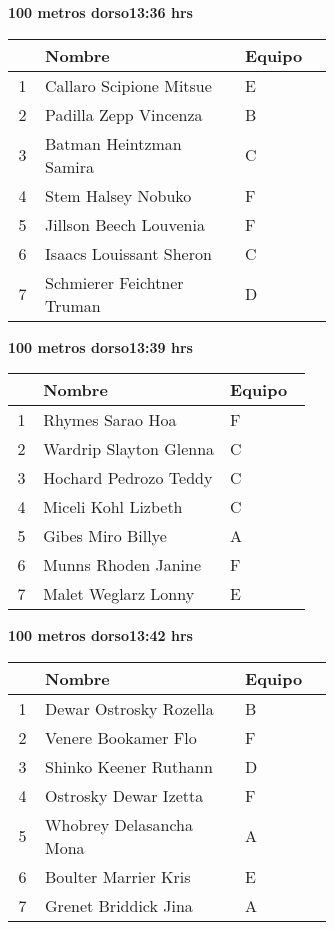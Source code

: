 \begin{minipage}{0.95\linewidth}
\begin{center}
\textbf{
100 metros dorso\hspace{1cm}13:36 hrs}
\end{center}
\begin{tabular}{cp{0.63\linewidth}l}
\hline
& \textbf{Nombre} & \textbf{Equipo} \\ \hline
1 & Callaro Scipione Mitsue & E \\ 
2 & Padilla Zepp Vincenza & B \\ 
3 & Batman Heintzman Samira & C \\ 
4 & Stem Halsey Nobuko & F \\ 
5 & Jillson Beech Louvenia & F \\ 
6 & Isaacs Louissant Sheron & C \\ 
7 & Schmierer Feichtner Truman & D \\ 
\end{tabular}
\end{minipage}
\begin{minipage}{0.95\linewidth}
\begin{center}
\textbf{
100 metros dorso\hspace{1cm}13:39 hrs}
\end{center}
\begin{tabular}{cp{0.63\linewidth}l}
\hline
& \textbf{Nombre} & \textbf{Equipo} \\ \hline
1 & Rhymes Sarao Hoa & F \\ 
2 & Wardrip Slayton Glenna & C \\ 
3 & Hochard Pedrozo Teddy & C \\ 
4 & Miceli Kohl Lizbeth & C \\ 
5 & Gibes Miro Billye & A \\ 
6 & Munns Rhoden Janine & F \\ 
7 & Malet Weglarz Lonny & E \\ 
\end{tabular}
\end{minipage}
\begin{minipage}{0.95\linewidth}
\begin{center}
\textbf{
100 metros dorso\hspace{1cm}13:42 hrs}
\end{center}
\begin{tabular}{cp{0.63\linewidth}l}
\hline
& \textbf{Nombre} & \textbf{Equipo} \\ \hline
1 & Dewar Ostrosky Rozella & B \\ 
2 & Venere Bookamer Flo & F \\ 
3 & Shinko Keener Ruthann & D \\ 
4 & Ostrosky Dewar Izetta & F \\ 
5 & Whobrey Delasancha Mona & A \\ 
6 & Boulter Marrier Kris & E \\ 
7 & Grenet Briddick Jina & A \\ 
\end{tabular}
\end{minipage}
